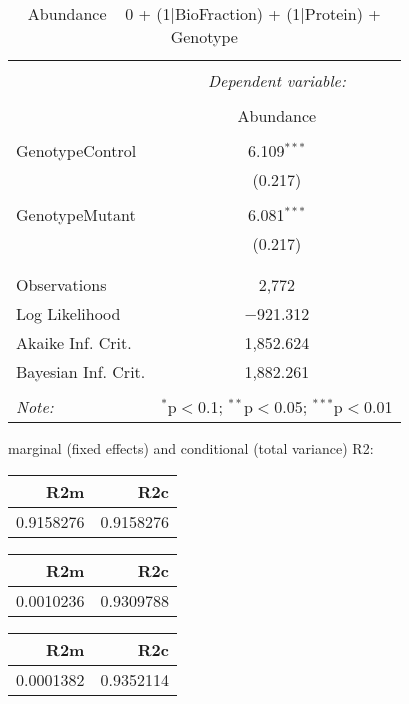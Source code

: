 \documentclass[11pt]{report}
\begin{document}
\begin{table}[!htbp] \centering 
  \caption{Abundance ~ 0 + (1|BioFraction) + (1|Protein) + Genotype} 
  \label{} 
\begin{tabular}{@{\extracolsep{5pt}}lc} 
\\[-1.8ex]\hline 
\hline \\[-1.8ex] 
 & \multicolumn{1}{c}{\textit{Dependent variable:}} \\ 
\cline{2-2} 
\\[-1.8ex] & Abundance \\ 
\hline \\[-1.8ex] 
 GenotypeControl & 6.109$^{***}$ \\ 
  & (0.217) \\ 
  & \\ 
 GenotypeMutant & 6.081$^{***}$ \\ 
  & (0.217) \\ 
  & \\ 
\hline \\[-1.8ex] 
Observations & 2,772 \\ 
Log Likelihood & $-$921.312 \\ 
Akaike Inf. Crit. & 1,852.624 \\ 
Bayesian Inf. Crit. & 1,882.261 \\ 
\hline 
\hline \\[-1.8ex] 
\textit{Note:}  & \multicolumn{1}{r}{$^{*}$p$<$0.1; $^{**}$p$<$0.05; $^{***}$p$<$0.01} \\ 
\end{tabular} 
\end{table} 
marginal (fixed effects) and conditional (total variance) R2:

\begin{tabular}{r|r}
\hline
R2m & R2c\\
\hline
0.9158276 & 0.9158276\\
\hline
\end{tabular}

\begin{tabular}{r|r}
\hline
R2m & R2c\\
\hline
0.0010236 & 0.9309788\\
\hline
\end{tabular}

\begin{tabular}{r|r}
\hline
R2m & R2c\\
\hline
0.0001382 & 0.9352114\\
\hline
\end{tabular}
\end{document}
